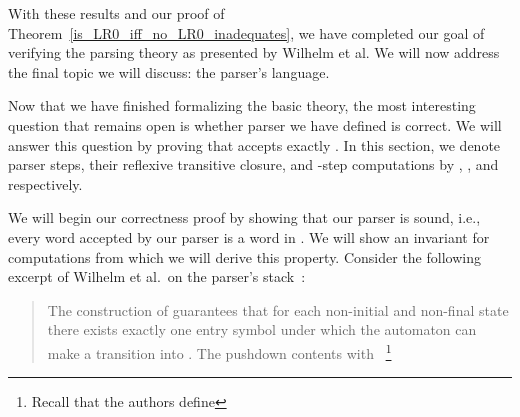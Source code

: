 \begin{isabellebody}
\begin{isamarkuptext}
With these results and our proof of Theorem~\ref{is_LR0_iff_no_LR0_inadequates}, we have completed
our goal of verifying the  parsing theory as presented by Wilhelm et al. We will now address
the final topic we will discuss: the parser's language.%
\end{isamarkuptext}\isamarkuptrue%
%
\isadelimdocument
%
\endisadelimdocument
%
\isatagdocument
%
\isamarkuptrue%
%
\endisatagdocument
{\isafolddocument}%
%
\isadelimdocument
%
\endisadelimdocument
%
\begin{isamarkuptext}%
Now that we have finished formalizing the basic  theory, the most interesting question
that remains open is whether  parser we have defined is correct.
We will answer this question by proving that  accepts exactly . In this
section, we denote parser steps, their reflexive transitive closure, and -step computations by
, , and  respectively.%
\end{isamarkuptext}\isamarkuptrue%
%
\isadelimdocument
%
\endisadelimdocument
%
\isatagdocument
%
\isamarkuptrue%
%
\endisatagdocument
{\isafolddocument}%
%
\isadelimdocument
%
\endisadelimdocument
%
\begin{isamarkuptext}%
We will begin our correctness proof by showing that our parser is sound, i.e., every word
accepted by our parser is a word in . We will show an invariant for  
computations from which we will derive this property. Consider the following excerpt of Wilhelm
et al.\ on the parser's stack~\cite[p. 110]{Wilhelm}:
\begin{quote}
The construction of  guarantees that for each non-initial and non-final state  there
exists exactly one entry symbol under which the automaton can make a transition into . The
pushdown contents  with ~\footnote{Recall that the authors define
}
\end{quote}
\end{isamarkuptext}
\end{isabellebody}
